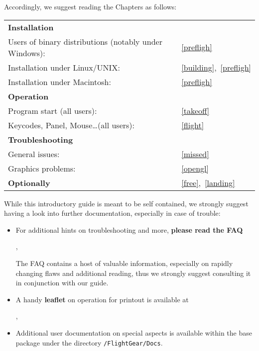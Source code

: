  \noindent
 Accordingly, we suggest reading the Chapters as follows:
 \medskip


\noindent
\begin{tabular}{ll}
 \textbf{Installation}                                  	&\\
 Users of binary distributions (notably under Windows):	 	&~\ref{prefligh}\\
 Installation under Linux/UNIX:               			&~\ref{building},~\ref{prefligh}\\
 Installation under Macintosh:               			&~\ref{prefligh}\\
  \textbf{Operation}                           			& \\
 Program start (all users):                      		&~\ref{takeoff}\\
 Keycodes, Panel, Mouse\ldots (all users):       		&~\ref{flight}\\
 \textbf{Troubleshooting}                      				& \\
 General issues:																						&~\ref{missed}\\
 Graphics problems: 									            				&~\ref{opengl}\\
 \textbf{Optionally}                           						&~\ref{free},~\ref{landing} 
\end{tabular}
\bigskip

\noindent
 While this introductory guide is meant to be self contained, we strongly suggest having a look into further documentation, especially in case of trouble:

\begin{itemize}
 \item For additional hints on troubleshooting and more, \textbf{please read the FAQ} 
 \medskip

 \noindent
 ,
 
 The FAQ contains a host of valuable information, especially on rapidly changing flaws and additional reading, thus we strongly suggest consulting it in conjunction with our guide.
 
 
 \item A handy \textbf{leaflet} on operation for printout is available at
 \medskip

 \noindent
 ,
 \item Additional user documentation on special aspects is available within the base package under the directory \texttt{/FlightGear/Docs}.
 \end{itemize}

